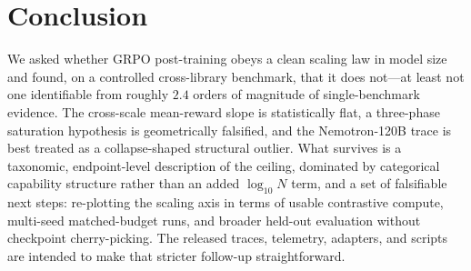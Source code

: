 \documentclass{article}
\begin{document}
\section{Conclusion}
\label{sec:p1-conclusion}
We asked whether GRPO post-training obeys a clean scaling law in model size and
found, on a controlled cross-library benchmark, that it does not---at least not
one identifiable from roughly $2.4$ orders of magnitude of single-benchmark evidence. The
cross-scale mean-reward slope is statistically flat, a three-phase saturation
hypothesis is geometrically falsified, and the Nemotron-120B trace is best treated
as a collapse-shaped structural outlier. What survives is a taxonomic, endpoint-level
description of the ceiling, dominated by categorical capability structure rather
than an added $\log_{10} N$ term, and a set of falsifiable next steps:
re-plotting the scaling axis in terms of usable contrastive compute, multi-seed
matched-budget runs, and broader held-out evaluation without checkpoint
cherry-picking. The released traces, telemetry, adapters, and scripts are intended to make
that stricter follow-up straightforward.
 

\end{document}
